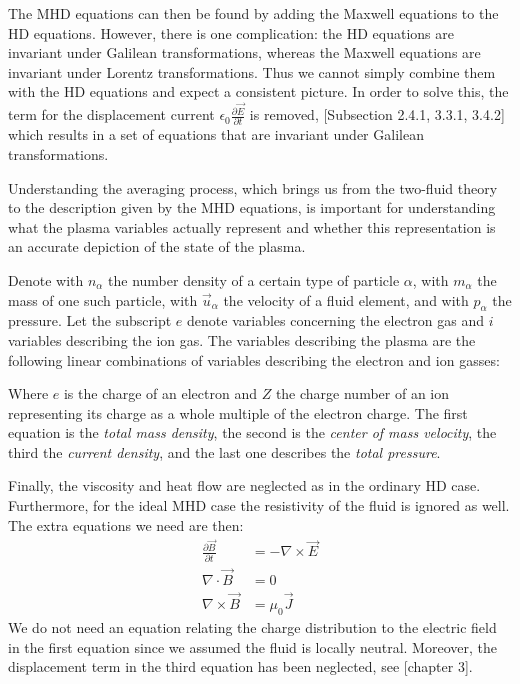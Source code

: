 The MHD equations can then be found by adding the Maxwell equations to the HD equations. However, there is one complication: the HD equations are invariant under Galilean transformations, whereas the Maxwell equations are invariant under Lorentz transformations. Thus we cannot simply combine them with the HD equations and expect a consistent picture.
In order to solve this, the term for the displacement current $\epsilon_0 \frac{\partial \vec{E}}{\partial t}$ is removed, \cite{notes-principles-MHD}[Subsection 2.4.1, 3.3.1, 3.4.2] which results in a set of equations that are invariant under Galilean transformations.

Understanding the averaging process, which brings us from the two-fluid theory to the description given by the MHD equations, is important for understanding what the plasma variables actually represent and whether this representation is an accurate depiction of the state of the plasma.

Denote with $n_\alpha$ the number density of a certain type of particle $\alpha$, with $m_\alpha$ the mass of one such particle, with $\vec{u}_\alpha$ the velocity of a fluid element, and with $p_\alpha$ the pressure.  Let the subscript $e$ denote variables concerning the electron gas and $i$ variables describing the ion gas. The variables describing the plasma are the following linear combinations of variables describing the electron and ion gasses:

{\centering 
\noindent {}
\par}

Where $e$ is the charge of an electron and $Z$ the charge number of an ion representing its charge as a whole multiple of the electron charge. The first equation is the \emph{total mass density}, the second is the \emph{center of mass velocity}, the third the \emph{current density}, and the last one describes the \emph{total pressure}.

Finally, the viscosity and heat flow are neglected as in the ordinary HD case. Furthermore, for the ideal MHD case the resistivity of the fluid is ignored as well. The extra equations we need are then:
\begin{align*}
	\frac{\partial \vec{B}}{\partial t} &= - \nabla \times \vec{E}\\
	\nabla \cdot \vec{B} &= 0\\
	\nabla \times \vec{B} &= \mu_0 \vec{J}
\end{align*}
We do not need an equation relating the charge distribution to the electric field in the first equation since we assumed the fluid is locally neutral. Moreover, the displacement term in the third equation has been neglected, see \cite{notes-astro-fluid-dyn} [chapter 3].

